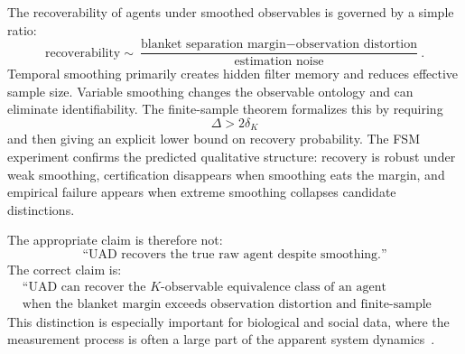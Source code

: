 \documentclass[10pt]{article}
\begin{document}
The recoverability of agents under smoothed observables is governed by a simple ratio:
\[
\text{recoverability}
\sim
\frac{
\text{blanket separation margin}
-
\text{observation distortion}
}{
\text{estimation noise}
}.
\]
Temporal smoothing primarily creates hidden filter memory and reduces effective sample size. Variable smoothing changes the observable ontology and can eliminate identifiability. The finite-sample theorem formalizes this by requiring
\[
\Delta>2\delta_K
\]
and then giving an explicit lower bound on recovery probability. The FSM experiment confirms the predicted qualitative structure: recovery is robust under weak smoothing, certification disappears when smoothing eats the margin, and empirical failure appears when extreme smoothing collapses candidate distinctions.

The appropriate claim is therefore not:
\[
\text{``UAD recovers the true raw agent despite smoothing.''}
\]
The correct claim is:
\begin{align*}
&\text{``UAD can recover the }K\text{-observable equivalence class of an agent} \\
&\text{when the blanket margin exceeds observation distortion and finite-sample error.''}
\end{align*}
This distinction is especially important for biological and social data, where the measurement process is often a large part of the apparent system dynamics~\cite{ConantAshby1970,biehl2022pomdp,Tishby2000IB}.



\end{document}
